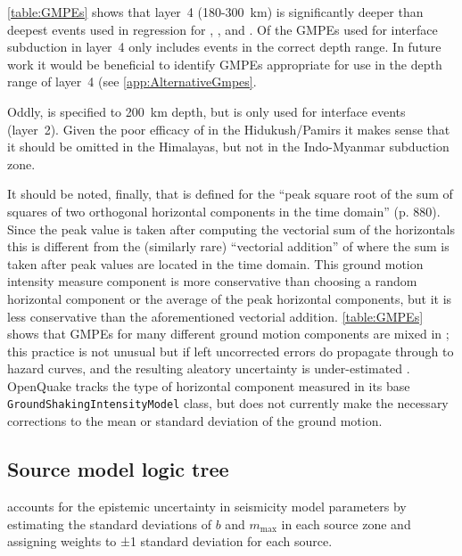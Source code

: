 \documentclass{article}
\begin{document}
\autoref{table:GMPEs} shows that layer~4 (180-300~km) is significantly deeper than deepest events used in regression for \citet[100~km]{atkinson2003empirical}, \citet[161~km]{lin2008ground}, \citet[120~km]{zhao2006attenuation} and \citet[148~km]{gupta2010response}. 
Of the GMPEs used for interface subduction in layer~4 only \citet[229~km]{youngs1997strong} includes events in the correct depth range.
In future work it would be beneficial to identify GMPEs appropriate for use in the depth range of layer~4 (see \autoref{app:AlternativeGmpes}.

Oddly, \cite{kanno2006new} is specified to 200~km depth, but is only used for interface events (layer~2).
Given the poor efficacy of \cite{kanno2006new} in the Hidukush/Pamirs it makes sense that it should be omitted in the Himalayas, but not in the Indo-Myanmar subduction zone.

It should be noted, finally, that \cite{kanno2006new} is defined for the ``peak square root of the sum of squares of two orthogonal horizontal components in the time domain'' (p. 880). Since the peak value is taken after computing the vectorial sum of the horizontals this is different from the (similarly rare) ``vectorial addition'' of \cite{douglas2003earthquake} where the sum is taken after  peak values are located in the time domain. 
This ground motion intensity measure component is more conservative than choosing a random horizontal component or the average of the peak horizontal components, but it is less conservative than the aforementioned vectorial addition. 
\autoref{table:GMPEs} shows that GMPEs for many different ground motion components are mixed in \cite{nath2012probabilistic}; this practice is not unusual but if left uncorrected errors do propagate through to hazard curves, and the resulting aleatory uncertainty is under-estimated \citep{beyer2006relationships}. 
OpenQuake tracks the type of horizontal component measured in its base \texttt{GroundShakingIntensityModel} class, but  does not currently make the necessary corrections to the mean or standard deviation of the ground motion.

\subsection{Source model logic tree}
\label{subsec:SourceTree}

\cite{nath2012probabilistic} accounts for the epistemic uncertainty in seismicity model parameters by estimating the standard deviations of $b$ and $m_\text{max}$ in each source zone and assigning weights to ±1 standard deviation for each source.
\end{document}
